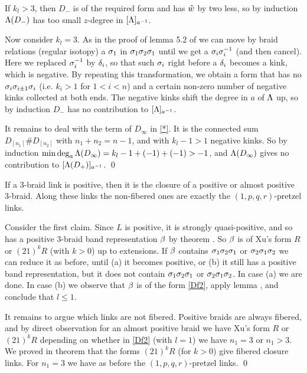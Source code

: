 If $k_l>3$, then $D_-$ is of the required form and has $\tilde w$
by two less, so by induction $\Lambda(D_-)$ has too small $z$-degree
in $[\Lambda]_{a^{-1}}$.

Now consider $k_l=3$. As in the proof of lemma 5.2 of \cite{ntriv} we
can move
by braid relations (regular isotopy) a $\sigma_1$ in $\sigma_1\sigma_2\sigma_1$
until we get a $\sigma_i\sigma_i^{-1}$ (and then cancel). Here we
replaced $\sigma_i^{-1}$ by $\delta_i$, so that such $\sigma_i$ right before
a $\delta_i$ becomes a kink, which is negative. By repeating this
transformation, we obtain a form that has no $\sigma_i\sigma_{i\pm 1}\sigma_i$
(i.e. $k_i>1$ for $1<i<n$) and a certain non-zero number of
negative kinks collected at both ends. The negative kinks
shift the degree in $a$ of $\Lambda$ up, so by induction $D_-$
has no contribution to $[\Lambda]_{a^{-1}}$.

It remains to deal with the term of $D_\infty$ in \eqref{*}.
It is the connected sum $D_{[n_1]}\# D_{[n_2]}$ with $n_1+n_2=n-1$,
and with $k_l-1>1$ negative kinks. So by induction $\min\deg_a\Lambda(D_\infty)
=k_l-1+(-1)+(-1)>-1$, and $\Lambda(D_\infty)$ gives no
contribution to $[\Lambda(D_+)]_{a^{-1}}$. \qed

\begin{theorem}\label{thposq}
If a 3-braid link is positive, then it is the closure
of a positive or almost positive 3-braid. Along these links
the non-fibered ones are exactly the $(1,p,q,r)$-pretzel
links.
\end{theorem}

\proof Consider the first claim.
% 
Since $L$ is positive, it is strongly
quasi-positive, and so has a positive 3-braid band representation
$\beta$ by theorem . So $\beta$ is of Xu's form $R$
or $(21)^kR$ (with $k>0$) up to extensions. If $\beta$ contains
$\sigma_1\sigma_2\sigma_1$ or $\sigma_2\sigma_1\sigma_2$ we can reduce it
as before, until (a) it becomes positive, or (b)
it still has a positive band representation, but it
does not contain $\sigma_1\sigma_2\sigma_1$ or $\sigma_2\sigma_1\sigma_2$.
In case (a) we are done. In case (b) we observe that
$\beta$ is of the form \eqref{Df2}, apply lemma
, and conclude that $l\le 1$.

It remains to argue which links are not fibered.
Positive braids are always fibered, and by direct
observation for an almost positive braid we have
Xu's form $R$ or $(21)^kR$ depending on whether
in \eqref{Df2} (with $l=1$) we have $n_1=3$ or
$n_1>3$. We proved in theorem 
that the forms $(21)^kR$ (for $k>0$) give fibered
closure links. For $n_1=3$ we have as before the
$(1,p,q,r)$-pretzel links. \qed

